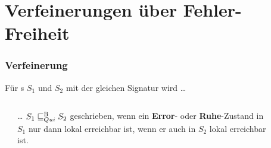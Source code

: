 \section{Verfeinerungen über Fehler-Freiheit}
\begin{frame}
  \frametitle{Verfeinerung}
  \begin{Def}[Basisrelation]
  Für \EIO{}s $S_1$ und $S_2$ mit der gleichen Signatur wird \dots
  \begin{columns}[]
    \begin{column}{.05\textwidth}
    \end{column}
    \begin{column}{.40\textwidth}
      \begin{block}{}
        \dots{} $S_1\sqsubseteq _{Qui}^\mathrm{B} S_2$ geschrieben, wenn ein \textbf{Error}- oder
        \textbf{Ruhe}-Zustand in $S_1$ nur dann lokal erreichbar ist, wenn er
        auch in $S_2$ lokal erreichbar ist.
      \end{block}
    \end{column}
    \begin{column}{.05\textwidth}
    \end{column}
    \begin{column}{.40\textwidth}
    \end{column}
    \begin{column}{.05\textwidth}
    \end{column}
  \end{columns}
    \vspace{1em}
  \end{Def}
\end{frame}

